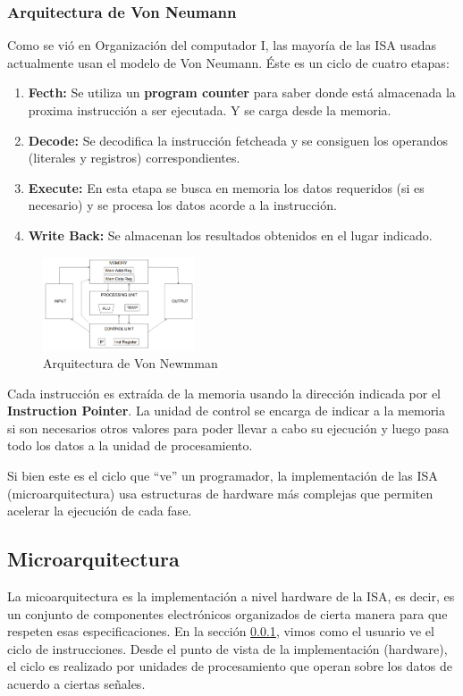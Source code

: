 \subsubsection{Arquitectura de Von Neumann}\label{sec::Intro::ISA::Von_Neuman}
Como se vió en Organización del computador I, las mayoría de las ISA usadas actualmente usan el modelo de Von Neumann. Éste es un ciclo de cuatro etapas: 

\begin{enumerate}
	\item \textbf{Fecth:} Se utiliza un \textbf{program counter} para saber donde está almacenada la proxima instrucción a ser ejecutada. Y se carga desde la memoria.
	\item \textbf{Decode:} Se decodifica la instrucción fetcheada y se consiguen los operandos (literales y registros) correspondientes.
	\item \textbf{Execute:} En esta etapa se busca en memoria los datos requeridos (si es necesario) y se procesa los datos acorde a la instrucción.
	\item \textbf{Write Back:} Se almacenan los resultados obtenidos en el lugar indicado.
\end{enumerate}

\begin{figure}[ht]
	\centering
	\includegraphics[width=0.4\textwidth]{imagenes/von-neuman-arquichtecture}
	\caption{Arquitectura de Von Newmman}
	\label{fig:intro:componentesIsa::vonsneumanarquichtecture}
\end{figure}
Cada instrucción es extraída de la memoria usando la dirección indicada por el \textbf{Instruction Pointer}. La unidad de control se encarga de indicar a la memoria si son necesarios otros valores para poder llevar a cabo su ejecución y luego pasa todo los datos a la unidad de procesamiento.

Si bien este es el ciclo que ``ve'' un programador, la implementación de las ISA (microarquitectura) usa estructuras de hardware más complejas que permiten acelerar la ejecución de cada fase.

\subsection{Microarquitectura}
La micoarquitectura es la implementación a nivel hardware de la ISA, es decir, es un conjunto de componentes electrónicos organizados de cierta manera para que respeten esas especificaciones. En la sección \ref{sec::Intro::ISA::Von_Neuman}, vimos como el usuario ve el ciclo de instrucciones. Desde el punto de vista de la implementación (hardware), el ciclo es realizado por unidades de procesamiento que operan sobre los datos de acuerdo a ciertas señales. 

